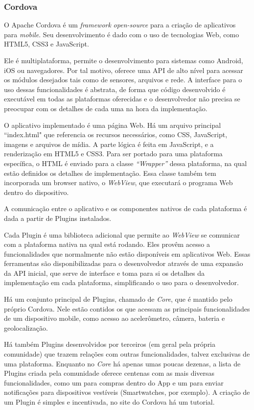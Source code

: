 \documentclass[a4paper,12pt]{article}
\begin{document}
\subsubsection{Cordova}

O Apache Cordova é um \emph{framework} \emph{open-source} para a criação de aplicativos para \emph{mobile}. Seu desenvolvimento é dado com o uso de tecnologias Web, como HTML5, CSS3 e JavaScript.

Ele é multiplataforma, permite o desenvolvimento para sistemas como Android, iOS ou navegadores. Por tal motivo, oferece uma API de alto nível para acessar os módulos desejados tais como de sensores, arquivos e rede. A interface para o uso dessas funcionalidades é abstrata, de forma que código desenvolvido é executável em todas as plataformas oferecidas e o desenvolvedor não precisa se preocupar com os detalhes de cada uma na hora da implementação.

O aplicativo implementado é uma página Web. Há um arquivo principal “index.html" que referencia os recursos necessários, como CSS, JavaScript, imagens e arquivos de mídia. A parte lógica é feita em JavaScript, e a renderização em HTML5 e CSS3. Para ser portado para uma plataforma específica, o HTML é enviado para a classe \emph{“Wrapper”} dessa plataforma, na qual estão definidos os detalhes de implementação. Essa classe também tem incorporada um browser nativo, o \emph{WebView}, que executará o programa Web dentro do dispositivo.

A comunicação entre o aplicativo e os componentes nativos de cada plataforma é dada a partir de Plugins instalados.

Cada Plugin é uma biblioteca adicional que permite ao \emph{WebView} se comunicar com a plataforma nativa na qual está rodando. Eles provêm acesso a funcionalidades que normalmente não estão disponíveis em aplicativos Web. Essas ferramentas são disponibilizadas para o desenvolvedor através de uma expansão da API inicial, que serve de interface e toma para si os detalhes da implementação em cada plataforma, simplificando o uso para o desenvolvedor.

Há um conjunto principal de Plugins, chamado de \emph{Core}, que é mantido pelo próprio Cordova. Nele estão contidos os que acessam as principais funcionalidades de um dispositivo mobile, como acesso ao acelerômetro, câmera, bateria e geolocalização.

Há também Plugins desenvolvidos por terceiros (em geral pela própria comunidade) que trazem relações com outras funcionalidades, talvez exclusivas de uma plataforma. Enquanto no \emph{Core} há apenas umas poucas dezenas, a lista de Plugins criada pela comunidade oferece centenas com as mais diversas funcionalidades, como um para compras dentro do App e um para enviar notificações para dispositivos vestíveis (Smartwatches, por exemplo). A criação de um Plugin é simples e incentivada, no site do Cordova há um tutorial.
\end{document}

